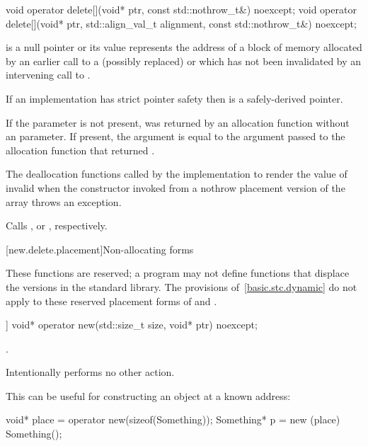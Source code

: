 %
\begin{itemdecl}
void operator delete[](void* ptr, const std::nothrow_t&) noexcept;
void operator delete[](void* ptr, std::align_val_t alignment, const std::nothrow_t&) noexcept;
\end{itemdecl}

\begin{itemdescr}
\pnum
\expects
{} is a null pointer or
its value represents the address of
a block of memory allocated by
an earlier call to a (possibly replaced)
or
which has not been invalidated by an intervening call to
.

\pnum
If an implementation has strict pointer safety
then  is a safely-derived pointer.

\pnum
If the  parameter is not present,
 was returned by an allocation function
without an  parameter.
If present, the  argument
is equal to the  argument
passed to the allocation function that returned .

\pnum
\effects
The
deallocation functions
called by the implementation
to render the value of  invalid
when the constructor invoked from a nothrow
placement version of the array  throws an exception.

\pnum
\replaceable
{}

\pnum
{}
Calls ,
or ,
respectively.
\end{itemdescr}

[new.delete.placement]{Non-allocating forms}

\pnum
These functions are reserved; a \Cpp{} program may not define functions that displace
the versions in the \Cpp{} standard library.
The provisions of~\ref{basic.stc.dynamic} do not apply to these reserved
placement forms of  and .

%
\begin{itemdecl}
[[nodiscard]] void* operator new(std::size_t size, void* ptr) noexcept;
\end{itemdecl}

\begin{itemdescr}
\pnum
\returns
{}.

\pnum
\remarks
Intentionally performs no other action.

\pnum
\begin{example}
This can be useful for constructing an object at a known address:

\begin{codeblock}
void* place = operator new(sizeof(Something));
Something* p = new (place) Something();
\end{codeblock}
\end{example}
\end{itemdescr}

